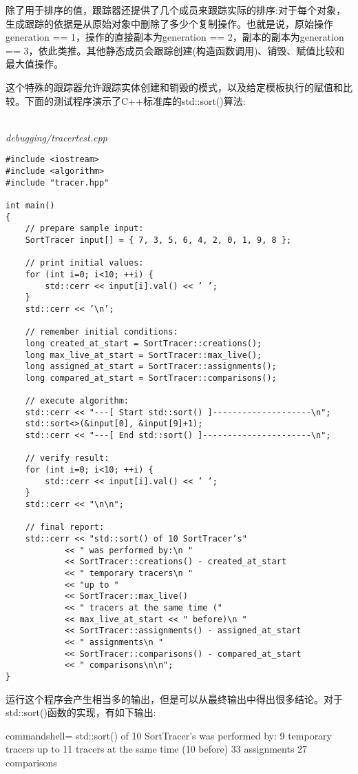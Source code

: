 除了用于排序的值，跟踪器还提供了几个成员来跟踪实际的排序:对于每个对象，生成跟踪的依据是从原始对象中删除了多少个复制操作。也就是说，原始操作generation == 1，操作的直接副本为generation == 2，副本的副本为generation == 3，依此类推。其他静态成员会跟踪创建(构造函数调用)、销毁、赋值比较和最大值操作。

这个特殊的跟踪器允许跟踪实体创建和销毁的模式，以及给定模板执行的赋值和比较。下面的测试程序演示了C++标准库的std::sort()算法:

\hspace*{\fill} \\ %
\noindent
\textit{debugging/tracertest.cpp}
\begin{lstlisting}[style=styleCXX]
#include <iostream>
#include <algorithm>
#include "tracer.hpp"

int main()
{
	// prepare sample input:
	SortTracer input[] = { 7, 3, 5, 6, 4, 2, 0, 1, 9, 8 };
	
	// print initial values:
	for (int i=0; i<10; ++i) {
		std::cerr << input[i].val() << ’ ’;
	}
	std::cerr << ’\n’;
	
	// remember initial conditions:
	long created_at_start = SortTracer::creations();
	long max_live_at_start = SortTracer::max_live();
	long assigned_at_start = SortTracer::assignments();
	long compared_at_start = SortTracer::comparisons();
	
	// execute algorithm:
	std::cerr << "---[ Start std::sort() ]--------------------\n";
	std::sort<>(&input[0], &input[9]+1);
	std::cerr << "---[ End std::sort() ]----------------------\n";
	
	// verify result:
	for (int i=0; i<10; ++i) {
		std::cerr << input[i].val() << ’ ’;
	}
	std::cerr << "\n\n";
	
	// final report:
	std::cerr << "std::sort() of 10 SortTracer’s"
			<< " was performed by:\n "
			<< SortTracer::creations() - created_at_start
			<< " temporary tracers\n "
			<< "up to "
			<< SortTracer::max_live()
			<< " tracers at the same time ("
			<< max_live_at_start << " before)\n "
			<< SortTracer::assignments() - assigned_at_start
			<< " assignments\n "
			<< SortTracer::comparisons() - compared_at_start
			<< " comparisons\n\n";
}
\end{lstlisting}

运行这个程序会产生相当多的输出，但是可以从最终输出中得出很多结论。对于std::sort()函数的实现，有如下输出:

\begin{tcblisting}{commandshell={}}
std::sort() of 10 SortTracer’s was performed by:
 9 temporary tracers
 up to 11 tracers at the same time (10 before)
 33 assignments
 27 comparisons
\end{tcblisting}

